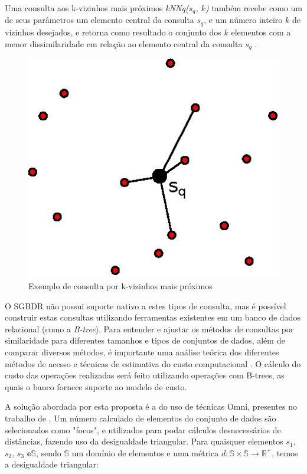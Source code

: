 Uma consulta aos k-vizinhos mais próximos \textit{kNNq($s_q$, $k$)} também recebe como um de seus parâmetros um elemento central da consulta $s_q$, e um número inteiro $k$ de vizinhos desejados, e retorna
como resultado o conjunto dos $k$ elementos com a menor dissimilaridade em relação ao elemento central da consulta $s_q$ \cite{POLA2010}.
\newpage
\begin{figure}[ht]
\centering
\captionsetup{width=0.50\textwidth, font=footnotesize, textfont=bf}
\includegraphics[width=.3\textwidth]{dados/figuras/knnq.eps}
\caption{Exemplo de consulta por k-vizinhos mais próximos}
\label{fig:exemploknnq}
\end{figure}

O SGBDR não possui suporte nativo a estes tipos de consulta, mas é possível construir estas consultas utilizando ferramentas existentes em um banco de dados relacional (como a \textit{B-tree}).
Para entender e ajustar os métodos de consultas por similaridade para diferentes tamanhos e tipos de conjuntos de dados, além de comparar diversos métodos, é importante uma análise teórica dos diferentes
métodos de acesso e técnicas de estimativa do custo computacional \cite{POLA2010}. O cálculo do custo das operações realizadas será feito utilizando operações com B-trees, as quais o banco fornece suporte
ao modelo de custo.

A solução abordada por esta proposta é a do uso de técnicas Omni, presentes no trabalho de \cite{Traina2001}. Um número calculado de elementos do conjunto de dados são selecionados como "focos", e utilizados para
podar cálculos desnecessários de distâncias, fazendo uso da desigualdade triangular. Para quaisquer elementos $s_1$, $s_2$, $s_3$ $\mathbb{e} \mathbb{S}$, sendo $\mathbb{S}$ um domínio de elementos
e uma métrica $d : \mathbb{S} \times \mathbb{S} \rightarrow \mathbb{R^+}$, temos a desigualdade triangular:

